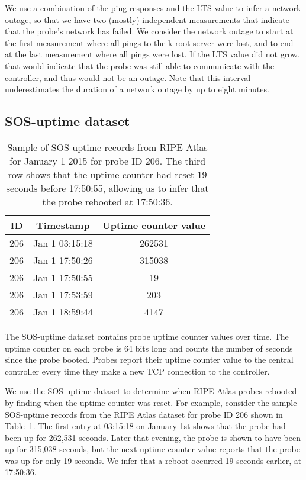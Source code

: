 We use a combination of the ping responses and the LTS value
to infer a network outage, so that we have two (mostly)
independent measurements that indicate that the probe's network
has failed.  We consider the network outage to start at the
first measurement where all pings to the k-root server were
lost, and to end at the last measurement where all pings
were lost.  If the LTS value did not grow, that would
indicate that the probe was still able to communicate with
the controller, and thus would not be an outage. Note that
this interval underestimates the duration of a network
outage by up to eight minutes.

\subsection{SOS-uptime dataset}
\label{sec:sos}

\begin{table}[th]
  \small
  \centering
  \begin{tabular}{c|c|c}
    \textbf{ID} & \textbf{Timestamp} & \textbf{Uptime counter value}\\
    \hline
    206 & Jan 1 03:15:18 & 262531\\
    206 & Jan 1 17:50:26 & 315038\\
    206 & Jan 1 17:50:55 & 19\\
    206 & Jan 1 17:53:59 & 203\\
    206 & Jan 1 18:59:44 & 4147\\
    \end{tabular}
    \caption[Sample SOS-uptime data during the reboot of a RIPE Atlas probe]{Sample of SOS-uptime records from RIPE Atlas for January 1 2015 for probe ID 206. The third row shows that the uptime counter had reset 19 seconds before 17:50:55, allowing us to infer that the probe rebooted at 17:50:36.}
    \label{tbl:sample_sos}
\end{table}

The SOS-uptime dataset contains probe uptime counter
values over time. The uptime counter on each probe is 64
bits long and counts the number of seconds since the probe
booted. Probes report their uptime counter value to the
central controller every time they make a new TCP connection
to the controller.

We use the SOS-uptime dataset to determine when RIPE Atlas probes rebooted
by finding when the uptime counter was
reset. For example, consider the sample SOS-uptime records from the
RIPE Atlas dataset for probe ID 206 shown in
Table~\ref{tbl:sample_sos}. The first entry at 03:15:18 on January 1st
shows that the probe had been up for 262,531 seconds. Later that
evening, the probe is shown to have been up for 315,038 seconds, but
the next uptime counter value reports that the probe was up for only
19 seconds. We infer that a reboot occurred 19 seconds earlier, at
17:50:36. 

